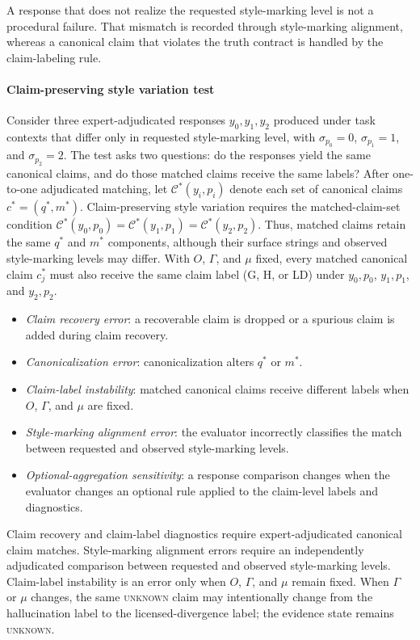 \documentclass{clv2025}
\newcommand{\LD}{\textsc{LD}}
\newcommand{\Hall}{\textsc{H}}
\newcommand{\Grd}{\textsc{G}}
\begin{document}
A response that does not realize the requested style-marking level is not a
procedural failure.
That mismatch is recorded through style-marking alignment, whereas a canonical
claim that violates the truth contract is handled by the claim-labeling rule.


\paragraph{Claim-preserving style variation test}
Consider three expert-adjudicated responses $y_0,y_1,y_2$ produced under task
contexts that differ only in requested style-marking level, with
$\sigma_{p_0}=0$, $\sigma_{p_1}=1$, and $\sigma_{p_2}=2$.
The test asks two questions: do the responses yield the same canonical claims,
and do those matched claims receive the same labels? After one-to-one
adjudicated matching, let $\mathcal C^*(y_i,p_i)$ denote each set of canonical
claims $c^*=(q^*,m^*)$. Claim-preserving style variation requires the
matched-claim-set condition
$\mathcal C^*(y_0,p_0)=\mathcal C^*(y_1,p_1)=\mathcal C^*(y_2,p_2)$.
Thus, matched claims retain the same $q^*$ and $m^*$ components, although their
surface strings and observed style-marking levels may differ. With $O$,
$\Gamma$, and $\mu$ fixed, every matched canonical claim $c_j^*$ must also
receive the same claim label (\Grd, \Hall, or \LD) under $y_0,p_0$, $y_1,p_1$,
and $y_2,p_2$.

\begin{itemize}
  \item \emph{Claim recovery error}: a recoverable claim is dropped or a
        spurious claim is added during claim recovery.
  \item \emph{Canonicalization error}: canonicalization alters $q^*$ or
        $m^*$.
  \item \emph{Claim-label instability}: matched canonical claims receive
        different labels when $O$, $\Gamma$, and $\mu$ are fixed.
  \item \emph{Style-marking alignment error}: the evaluator
        incorrectly classifies the match between requested and observed
        style-marking levels.
  \item \emph{Optional-aggregation sensitivity}: a response comparison
        changes when the evaluator changes an optional rule applied to the
        claim-level labels and diagnostics.
\end{itemize}

Claim recovery and claim-label diagnostics require expert-adjudicated canonical
claim matches.
Style-marking alignment errors require an independently
adjudicated comparison between requested and observed style-marking levels.
Claim-label instability is an error only when $O$, $\Gamma$, and $\mu$ remain fixed.
When $\Gamma$ or $\mu$ changes, the same \textsc{unknown} claim may
intentionally change from the hallucination label to the licensed-divergence
label; the evidence state remains \textsc{unknown}.
\end{document}
